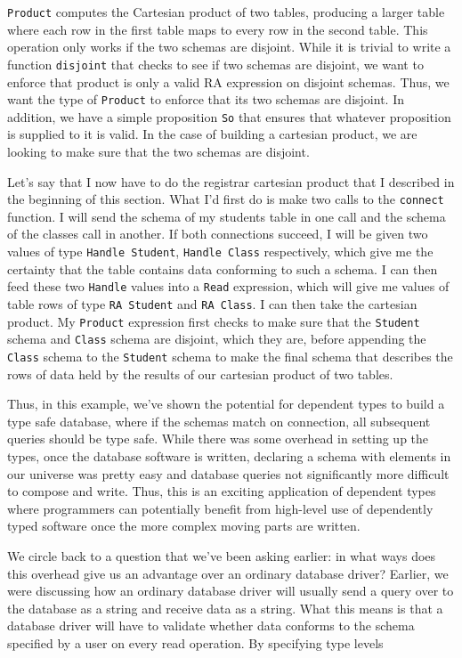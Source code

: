 \texttt{Product} computes the Cartesian product of two tables, producing a
larger table where each row in the first table maps to every row in the second
table. This operation only works if the two schemas are disjoint. While it is
trivial to write a function \texttt{disjoint} that checks to see if two schemas
are disjoint, we want to enforce that product is only a valid RA expression on
disjoint schemas. Thus, we want the type of \texttt{Product} to enforce that its
two schemas are disjoint. In addition, we have a simple proposition \texttt{So}
that ensures that whatever proposition is supplied to it is valid. In the case
of building a cartesian product, we are looking to make sure that the two
schemas are disjoint. 

Let's say that I now have to do the registrar cartesian product that I described
in the beginning of this section. What I'd first do is make two calls to the
\texttt{connect} function. I will send the schema of my students table in one
call and the schema of the classes call in another. If both connections succeed,
I will be given two values of type \texttt{Handle Student}, \texttt{Handle
Class} respectively, which give me the certainty that the table contains data
conforming to such a schema. I can then feed these two \texttt{Handle} values into a
\texttt{Read} expression, which will give me values of table rows of type
\texttt{RA Student} and \texttt{RA Class}. I can then take the cartesian
product. My \texttt{Product} expression first checks to make sure that the
\texttt{Student} schema and \texttt{Class} schema are disjoint, which they are,
before appending the \texttt{Class} schema to the \texttt{Student} schema to
make the final schema that describes the rows of data held by the results of our
cartesian product of two tables. 

Thus, in this example, we've shown the potential for dependent types to build a
type safe database, where if the schemas match on connection, all subsequent
queries should be type safe. While there was some overhead in setting up the
types, once the database software is written, declaring a schema with elements
in our universe was pretty easy and database queries not significantly more
difficult to compose and write. Thus, this is an exciting application of
dependent types where programmers can potentially benefit from high-level use of
dependently typed software once the more complex moving parts are written. 

We circle back to a question that we've been asking earlier: in what ways does
this overhead give us an advantage over an ordinary database driver? Earlier, we
were discussing how an ordinary database driver will usually send a query over
to the database as a string and receive data as a string. What this means is
that a database driver will have to validate whether data conforms to the schema
specified by a user on every read operation. By specifying type levels 



